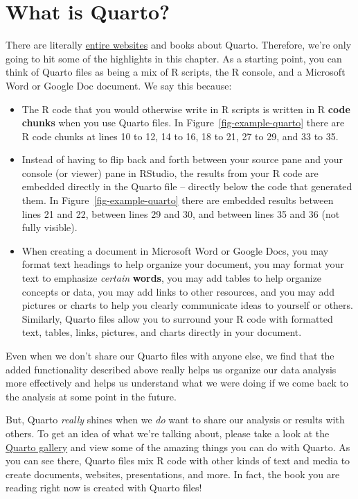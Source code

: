 \documentclass[
  letterpaper,
  DIV=11,
  numbers=noendperiod]{scrreprt}
\begin{document}
\section{What is Quarto?}\label{what-is-quarto}

There are literally \href{https://quarto.org/}{entire websites} and
books about Quarto. Therefore, we're only going to hit some of the
highlights in this chapter. As a starting point, you can think of Quarto
files as being a mix of R scripts, the R console, and a Microsoft Word
or Google Doc document. We say this because:

\begin{itemize}
\item
  The R code that you would otherwise write in R scripts is written in R
  \textbf{code chunks} when you use Quarto files. In
  Figure~\ref{fig-example-quarto} there are R code chunks at lines 10 to
  12, 14 to 16, 18 to 21, 27 to 29, and 33 to 35.
\item
  Instead of having to flip back and forth between your source pane and
  your console (or viewer) pane in RStudio, the results from your R code
  are embedded directly in the Quarto file -- directly below the code
  that generated them. In Figure~\ref{fig-example-quarto} there are
  embedded results between lines 21 and 22, between lines 29 and 30, and
  between lines 35 and 36 (not fully visible).
\item
  When creating a document in Microsoft Word or Google Docs, you may
  format text headings to help organize your document, you may format
  your text to {emphasize} \emph{certain} \textbf{words}, you may add
  tables to help organize concepts or data, you may add links to other
  resources, and you may add pictures or charts to help you clearly
  communicate ideas to yourself or others. Similarly, Quarto files allow
  you to surround your R code with formatted text, tables, links,
  pictures, and charts directly in your document.
\end{itemize}

Even when we don't share our Quarto files with anyone else, we find that
the added functionality described above really helps us organize our
data analysis more effectively and helps us understand what we were
doing if we come back to the analysis at some point in the future.

But, Quarto \emph{really} shines when we \emph{do} want to share our
analysis or results with others. To get an idea of what we're talking
about, please take a look at the
\href{https://quarto.org/docs/gallery/}{Quarto gallery} and view some of
the amazing things you can do with Quarto. As you can see there, Quarto
files mix R code with other kinds of text and media to create documents,
websites, presentations, and more. In fact, the book you are reading
right now is created with Quarto files!
\end{document}
